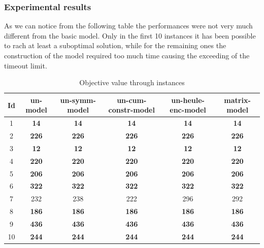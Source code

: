 \subsubsection*{Experimental results}

As we can notice from the following table the performances were not very much different from the basic model. Only in the first 10 instances it has been possible to rach at least a suboptimal solution, while for the remaining ones the construction of the model required too much time causing the exceeding of the timeout limit.
\begin{table}[H]
    \centering
    \caption{Objective value through instances}
    \begin{tabular}{cccccc}
            \toprule
            Id & un-model & un-symm-model & un-cum-constr-model & un-heule-enc-model & matrix-model \\ 
            \midrule
            1 & \textbf{14} &       \textbf{14} &   \textbf{14} &   \textbf{14} &   \textbf{14} \\ 
            2 & \textbf{226} &      \textbf{226} &  \textbf{226} &  \textbf{226} &  \textbf{226} \\ 
            3 & \textbf{12} &       \textbf{12} &   \textbf{12} &   \textbf{12} &   \textbf{12} \\ 
            4 & \textbf{220} &      \textbf{220} &  \textbf{220} &  \textbf{220} &  \textbf{220} \\ 
            5 & \textbf{206} &      \textbf{206} &  \textbf{206} &  \textbf{206} &  \textbf{206} \\ 
            6 & \textbf{322} &      \textbf{322} &  \textbf{322} &  \textbf{322} &  \textbf{322} \\ 
            7 & 232 &       238 &   222 &   296 &   292 \\ 
            8 & \textbf{186} &      \textbf{186} &  \textbf{186} &  \textbf{186} &  \textbf{186} \\ 
            9 & \textbf{436} &      \textbf{436} &  \textbf{436} &  \textbf{436} &  \textbf{436} \\ 
            10 & \textbf{244} &     \textbf{244} &  \textbf{244} &  \textbf{244} &  \textbf{244} \\ 
            \bottomrule
    \end{tabular}
\end{table}


